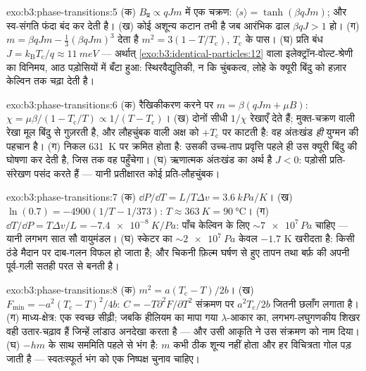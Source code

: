 \begin{solution}{exo:b3:phase-transitions:5}
(क) $B_{\text{प्र}} \propto qJm$ में एक चक्रण: $\langle s\rangle =
\tanh(\beta qJm)$; और स्व-संगति फंदा बंद कर देती है। (ख) कोई अशून्य
कटान तभी है जब आरंभिक ढाल $\beta qJ > 1$ हो। (ग) $m =
\beta qJm - \tfrac13(\beta qJm)^3$ देता है $m^2 = 3(1 -
T/T_{\text{c}})$, $T_{\text{c}}$ के पास। (घ) प्रति बंध $J =
k_{\text{B}}T_{\text{c}}/q \approx \qty{11}{meV}$ ---
अर्थात् \cref{exo:b3:identical-particles:12} वाला
इलेक्ट्रॉन-वोल्ट-श्रेणी का विनिमय, आठ पड़ोसियों में बँटा हुआ:
स्थिरवैद्युतिकी, न कि चुंबकत्व, लोहे के क्यूरी बिंदु को हज़ार
केल्विन तक चढ़ा देती है।
\end{solution}

\begin{solution}{exo:b3:phase-transitions:6}
(क) रैखिकीकरण करने पर $m = \beta(qJm + \mu B)$: $\chi =
\mu\beta/(1 - T_{\text{c}}/T) \propto 1/(T - T_{\text{c}})$। (ख)
दोनों सीधी $1/\chi$ रेखाएँ देते हैं; मुक्त-चक्रण वाली रेखा
मूल बिंदु से गुज़रती है, और लौहचुंबक वाली अक्ष को
$+T_{\text{c}}$ पर काटती है: वह अंतःखंड \emph{ही} युग्मन की
पहचान है। (ग) निकल \qty{631}{K} पर क्रमित होता है: उसकी उच्च-ताप
प्रवृत्ति पहले ही उस क्यूरी बिंदु की घोषणा कर देती है, जिस तक वह
पहुँचेगा।
(घ) ऋणात्मक अंतःखंड का अर्थ है $J < 0$: पड़ोसी प्रति-संरेखण पसंद
करते हैं --- यानी प्रतीक्षारत कोई प्रति-लौहचुंबक।
\end{solution}

\begin{solution}{exo:b3:phase-transitions:7}
(क) $\dd P/\dd T = L/T\Delta v = \qty{3.6}{kPa/K}$। (ख)
$\ln(0.7) = -4900(1/T - 1/373)$: $T \approx \qty{363}{K} =
\qty{90}{\celsius}$। (ग) $\dd T/\dd P = T\Delta v/L =
\qty{-7.4e-8}{K/Pa}$: पाँच केल्विन के लिए $\sim\num{7e7}\,\unit{Pa}$
चाहिए --- यानी लगभग सात सौ वायुमंडल। (घ) स्केटर का
$\sim\qty{2e7}{Pa}$ केवल $-1.7$ K खरीदता है: किसी ठंडे मैदान पर
दाब-गलन विफल हो जाता है; और चिकनी फ़िल्म घर्षण से हुए तापन तथा
बर्फ़ की अपनी पूर्व-गली सतही परत से बनती है।
\end{solution}

\begin{solution}{exo:b3:phase-transitions:8}
(क) $m^2 = a(T_{\text{c}} - T)/2b$। (ख) $F_{\min} =
-a^2(T_{\text{c}} - T)^2/4b$: $C = -T\partial^2F/\partial T^2$
संक्रमण पर $a^2T_{\text{c}}/2b$ जितनी छलाँग लगाता है। (ग)
माध्य-क्षेत्र: एक स्वच्छ सीढ़ी; जबकि हीलियम का मापा गया
$\lambda$-आकार का, लगभग-लघुगणकीय शिखर वही उतार-चढ़ाव हैं जिन्हें
लांडाउ अनदेखा करता है --- और उसी आकृति ने उस संक्रमण को नाम दिया।
(घ) $-hm$ के साथ सममिति पहले से भंग है:
$m$ कभी ठीक शून्य नहीं होता और हर विचित्रता गोल पड़ जाती है ---
स्वतःस्फूर्त भंग को एक निष्पक्ष चुनाव चाहिए।
\end{solution}

